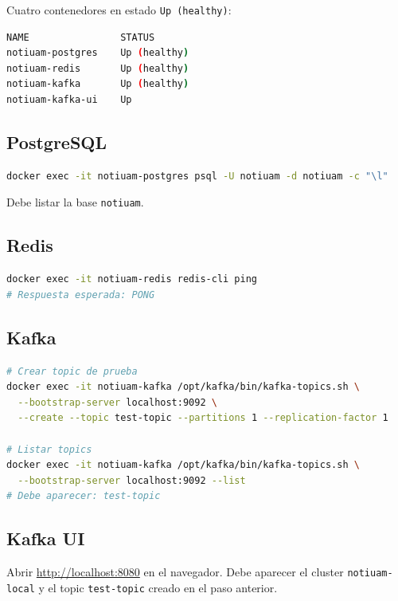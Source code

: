 \begin{exito}
Cuatro contenedores en estado \texttt{Up (healthy)}:
\begin{lstlisting}[language=bash]
NAME                STATUS
notiuam-postgres    Up (healthy)
notiuam-redis       Up (healthy)
notiuam-kafka       Up (healthy)
notiuam-kafka-ui    Up
\end{lstlisting}
\end{exito}

\subsection{PostgreSQL}

\begin{lstlisting}[language=bash]
docker exec -it notiuam-postgres psql -U notiuam -d notiuam -c "\l"
\end{lstlisting}

Debe listar la base \texttt{notiuam}.

\subsection{Redis}

\begin{lstlisting}[language=bash]
docker exec -it notiuam-redis redis-cli ping
# Respuesta esperada: PONG
\end{lstlisting}

\subsection{Kafka}

\begin{lstlisting}[language=bash]
# Crear topic de prueba
docker exec -it notiuam-kafka /opt/kafka/bin/kafka-topics.sh \
  --bootstrap-server localhost:9092 \
  --create --topic test-topic --partitions 1 --replication-factor 1

# Listar topics
docker exec -it notiuam-kafka /opt/kafka/bin/kafka-topics.sh \
  --bootstrap-server localhost:9092 --list
# Debe aparecer: test-topic
\end{lstlisting}

\subsection{Kafka UI}

Abrir \url{http://localhost:8080} en el navegador. Debe aparecer el cluster \texttt{notiuam-local} y el topic \texttt{test-topic} creado en el paso anterior.

